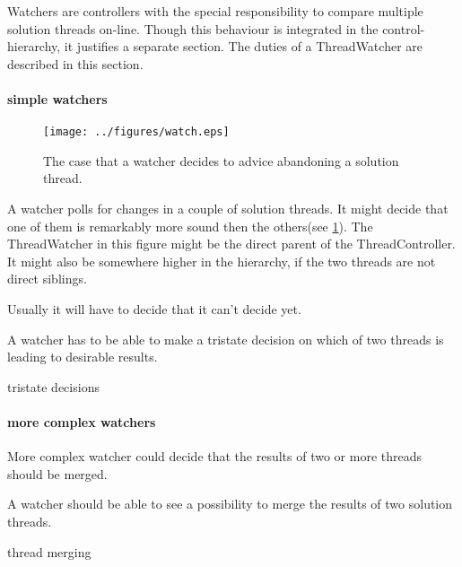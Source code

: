 \documentclass[]{lofar}
\begin{document}
        Watchers are controllers with the special responsibility to
        compare multiple solution threads on-line. Though this
        behaviour is integrated in the control-hierarchy, it justifies
        a separate section. The duties of a ThreadWatcher are
        described in this section.

        \paragraph{simple watchers}
        \label{par:simple-watchers}\hypertarget{par:simple-watchers}{}
          \begin{figure}
            \texttt{[image: ../figures/watch.eps]}
            \hypertarget{fig:watchers}{}
            \caption{The case that a watcher decides to advice
            abandoning a solution thread.\label{fig:watchers}}
          \end{figure}

          A watcher polls for changes in a couple of solution
          threads. It might decide that one of them is remarkably more
          sound then the others(see
          \hyperlink{fig:watchers}{\ref{fig:watchers}}). The
          ThreadWatcher in this figure might be the direct parent of
          the ThreadController. It might also be somewhere higher in
          the hierarchy, if the two threads are not direct siblings.

          Usually it will have to decide that it can't decide yet.

          \begin{requirement}
            A watcher has to be able to make a tristate decision on
            which of two threads is leading to desirable results.
            \caption{tristate decisions\label{req:no-decision}}
          \end{requirement}

        \paragraph{more complex watchers}
        \label{par:complex-watchers}\hypertarget{par:complex-watchers}{}

          More complex watcher could decide that the results of two or
          more threads should be merged.

          \begin{requirement}
            A watcher should be able to see a possibility to merge the
            results of two solution threads.
            \caption{thread merging\label{req:merge}}
          \end{requirement}
\end{document}
